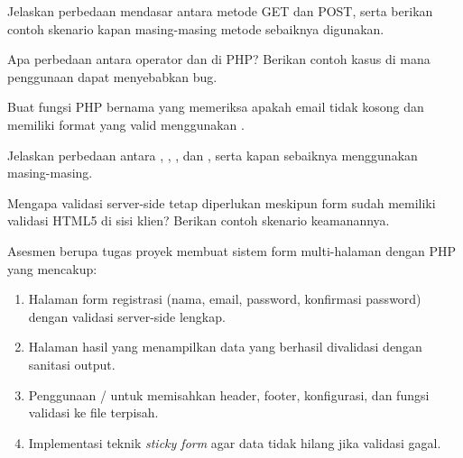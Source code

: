 \documentclass[../main.tex]{subfiles}
\begin{document}
\begin{latihan}
  \item Jelaskan perbedaan mendasar antara metode GET dan POST, serta berikan contoh skenario kapan masing-masing metode sebaiknya digunakan.
  \item Apa perbedaan antara operator \code{==} dan \code{===} di PHP? Berikan contoh kasus di mana penggunaan \code{==} dapat menyebabkan bug.
  \item Buat fungsi PHP bernama  yang memeriksa apakah email tidak kosong dan memiliki format yang valid menggunakan .
  \item Jelaskan perbedaan antara , , , dan , serta kapan sebaiknya menggunakan masing-masing.
  \item Mengapa validasi server-side tetap diperlukan meskipun form sudah memiliki validasi HTML5 di sisi klien? Berikan contoh skenario keamanannya.
\end{latihan}

\begin{asesmen}
Asesmen berupa tugas proyek membuat sistem form multi-halaman dengan PHP yang mencakup:
\begin{enumerate}
  \item Halaman form registrasi (nama, email, password, konfirmasi password) dengan validasi server-side lengkap.
  \item Halaman hasil yang menampilkan data yang berhasil divalidasi dengan sanitasi output.
  \item Penggunaan / untuk memisahkan header, footer, konfigurasi, dan fungsi validasi ke file terpisah.
  \item Implementasi teknik \textit{sticky form} agar data tidak hilang jika validasi gagal.
\end{enumerate}
\end{asesmen}
\end{document}
